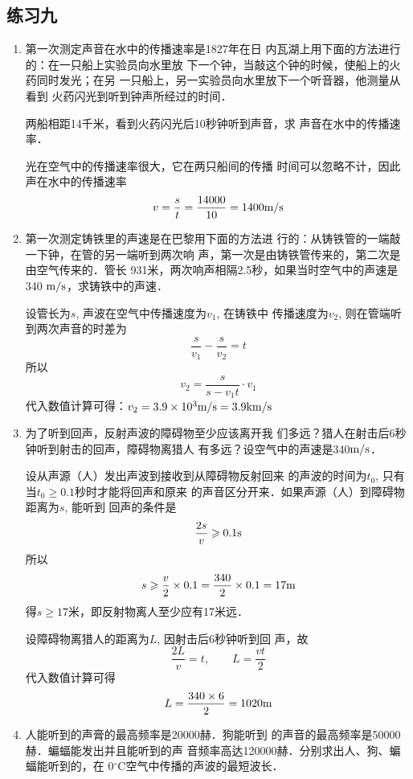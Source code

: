 \subsection{练习九}

\begin{enumerate}
\item 第一次测定声音在水中的传播速率是1827年在日
内瓦湖上用下面的方法进行的：在一只船上实验员向水里放
下一个钟，当敲这个钟的时候，使船上的火药同时发光；在另
一只船上，另一实验员向水里放下一个听音器，他测量从看到
火药闪光到听到钟声所经过的时间．

两船相距14千米，看到火药闪光后10秒钟听到声音，求
声音在水中的传播速率．


\begin{solution}
    光在空气中的传播速率很大，它在两只船间的传播
时间可以忽略不计，因此声在水中的传播速率
\[v=\frac{s}{t}=\frac{14000}{10}=1400\ms\]
\end{solution}
\item 第一次测定铸铁里的声速是在巴黎用下面的方法进
行的：从铸铁管的一端敲一下钟，在管的另一端听到两次响
声，第一次是由铸铁管传来的，第二次是由空气传来的．管长
931米，两次响声相隔2.5秒，如果当时空气中的声速是340
$\ms$，求铸铁中的声速．

\begin{solution}
    设管长为$s$, 声波在空气中传播速度为$v_1$, 在铸铁中
    传播速度为$v_2$, 则在管端听到两次声音的时差为
\[\frac{s}{v_1}-\frac{s}{v_2}=t\]
所以\[v_2=\frac{s}{s-v_1t}\cdot v_1\]
代入数值计算可得：$v_2=3.9\x 10^3\ms=3.9{\rm km/s}$
\end{solution}
\item 为了听到回声，反射声波的障碍物至少应该离开我
们多远？猎人在射击后6秒钟听到射击的回声，障碍物离猎人
有多远？设空气中的声速是340$\ms$．

\begin{solution}
    设从声源（人）发出声波到接收到从障碍物反射回来
    的声波的时间为$t_0$, 只有当$t_0\ge 0.1$秒时才能将回声和原来
    的声音区分开来．如果声源（人）到障碍物距离为$s$, 能听到
    回声的条件是
    \[\frac{2s}{v}\ge 0.1{\rm s}\]
    所以
 \[s\ge   \frac{v}{2}\x0.1=\frac{340}{2}\x 0.1=17{\rm m}\]
    得$s\ge 17$米，即反射物离人至少应有17米远．

    设障碍物离猎人的距离为$L$, 因射击后6秒钟听到回
    声，故
    \[\frac{2L}{v}=t,\qquad L=\frac{vt}{2}\]
    代入数值计算可得
\[L=\frac{340\x 6}{2}=1020{\rm m}\]
\end{solution}
\item 人能听到的声膏的最高频率是20000赫．狗能听到
的声音的最高频率是50000赫．蝙蝠能发出并且能听到的声
音频率高达120000赫．分别求出人、狗、蝙蝠能听到的，在
0$^{\circ}$C空气中传播的声波的最短波长．


\end{enumerate}
